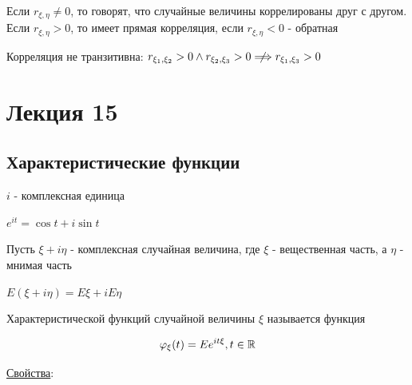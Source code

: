 \documentclass[12pt]{article}
\begin{document}
\Def Если $r_{\xi,\eta} \neq 0$, то говорят, что случайные величины коррелированы друг с другом. Если $r_{\xi,\eta} > 0$, 
то имеет прямая корреляция, если $r_{\xi,\eta} < 0$ - обратная

\Nota Корреляция не транзитивна: $r_{\xi_1,\xi_2} > 0 \land r_{\xi_2,\xi_3} > 0 \centernot\Longrightarrow r_{\xi_1,\xi_3} > 0$








\section{Лекция 15}

\subsection{Характеристические функции}

\Mem $i$ - комплексная единица

\Mems $e^{it} = \cos t + i \sin t$

Пусть $\xi + i\eta$ - комплексная случайная величина, где $\xi$ - вещественная часть, а $\eta$ - мнимая часть

\Def $E(\xi + i\eta) = E\xi + iE\eta$

\hypertarget{characteristicfunction}{}

\Def Характеристической функций случайной величины $\xi$ называется функция 

\[\varphi_\xi(t) = Ee^{it\xi}, t \in \mathbb{R}\]

\underline{Свойства}:
\end{document}
